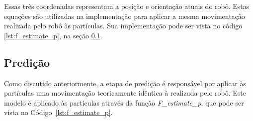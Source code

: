 \documentclass[
	12pt,				%
	openright,			%
	oneside,			%
	a4paper,			%
	english,			%
	french,				%
	spanish,			%
	brazil,				%
	]{abntex2}
\newcommand\todo[1]{~\newline{\color{red}\framebox[\columnwidth]{\parbox{.95\linewidth}{TODO: #1}}}~\newline}
\newcommand\todo[1]{}
\begin{document}
Essas três coordenadas representam a posição e orientação atuais do robô. Estas equações são utilizadas na implementação para aplicar a mesma movimentação realizada pelo robô às partículas. Sua implementação pode ser vista no código \ref{lst:f_estimate_p}, na seção \ref{subsec:predição}.


\subsection{Predição}
\label{subsec:predição}
Como discutido anteriormente, a etapa de predição é responsável por aplicar às partículas uma movimentação teoricamente idêntica à realizada pelo robô.
Este modelo é aplicado às partículas através da função \emph{F\_estimate\_p}, que pode ser vista no Código~\ref{lst:f_estimate_p}.


%

\end{document}

